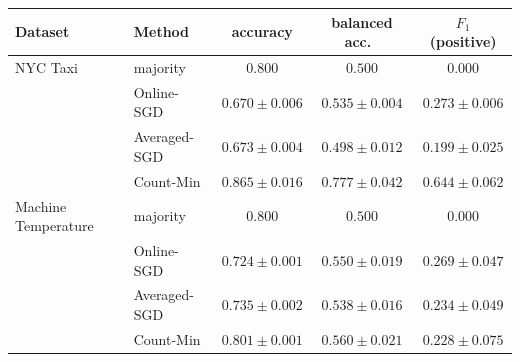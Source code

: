 \documentclass[sensors,article,submit,pdftex,moreauthors]{Definitions/mdpi}
\providecommand{\DIFaddbeginFL}{} %
\providecommand{\DIFaddendFL}{} %
\providecommand{\DIFdelendFL}{} %
\begin{document}
\begin{table}[t]
\DIFdelendFL \DIFaddbeginFL \small
\begin{tabular}{@{}llccc@{}}
\toprule
Dataset & Method & accuracy & balanced acc.\ & $F_1$ (positive) \\
\midrule
NYC Taxi              & majority           & $0.800$ & $0.500$ & $0.000$ \\
                      & Online-SGD         & $0.670 \pm 0.006$ & $0.535 \pm 0.004$ & $0.273 \pm 0.006$ \\
                      & Averaged-SGD       & $0.673 \pm 0.004$ & $0.498 \pm 0.012$ & $0.199 \pm 0.025$ \\
                      & Count-Min          & $0.865 \pm 0.016$ & $0.777 \pm 0.042$ & $0.644 \pm 0.062$ \\
\midrule
Machine Temperature   & majority           & $0.800$ & $0.500$ & $0.000$ \\
                      & Online-SGD         & $0.724 \pm 0.001$ & $0.550 \pm 0.019$ & $0.269 \pm 0.047$ \\
                      & Averaged-SGD       & $0.735 \pm 0.002$ & $0.538 \pm 0.016$ & $0.234 \pm 0.049$ \\
                      & Count-Min          & $0.801 \pm 0.001$ & $0.560 \pm 0.021$ & $0.228 \pm 0.075$ \\
\bottomrule
\end{tabular}
\DIFaddendFL \end{table}
\end{document}
